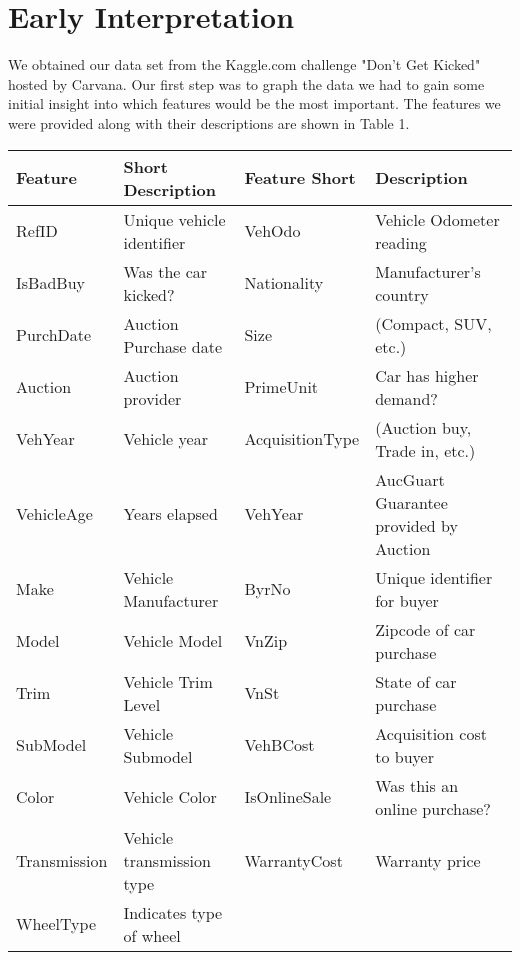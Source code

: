 \documentclass[paper=letter, fontsize=11pt]{scrartcl} %
\numberwithin{equation}{section} %
\begin{document}
\section{Early Interpretation}
	We obtained our data set from the Kaggle.com challenge "Don't Get Kicked" hosted by Carvana. Our first step was to graph the data we had to gain some initial insight into which features would be the most important. The features we were provided along with their descriptions are shown in Table 1. 
\begin{table}[!ht]
	\begin{center}
	 \begin{tabular}{ | p{3cm} | p{4cm} | p{3cm} | p{4cm} |}
	 \hline
		{\bf Feature}	& {\bf Short Description} & {\bf Feature	Short} & {\bf Description} \\ \hline
		RefID	& Unique vehicle identifier &	VehOdo & Vehicle Odometer reading \\ \hline
		IsBadBuy & Was the car kicked? & Nationality & Manufacturer's country\\ \hline
		PurchDate & Auction Purchase date & Size & (Compact, SUV, etc.) \\ \hline
		Auction & Auction provider & PrimeUnit & Car has higher demand? \\ \hline
		VehYear & Vehicle year & AcquisitionType & (Auction buy, Trade in, etc.) \\ \hline
		VehicleAge & Years elapsed & VehYear & AucGuart	Guarantee provided by Auction \\ \hline
		Make & Vehicle Manufacturer & ByrNo & Unique identifier for buyer \\ \hline
		Model & Vehicle Model & VnZip & Zipcode of car purchase \\ \hline
		Trim & Vehicle Trim Level & VnSt & State of car purchase \\ \hline
		SubModel & Vehicle Submodel & VehBCost & Acquisition cost to buyer \\ \hline
		Color & Vehicle Color & IsOnlineSale & Was this an online purchase? \\ \hline
		Transmission & Vehicle transmission type & WarrantyCost & Warranty price \\ \hline
		WheelType & Indicates type of wheel & & \\ \hline
	 \end{tabular}
	\end{center}
	

\end{table}
\end{document}
